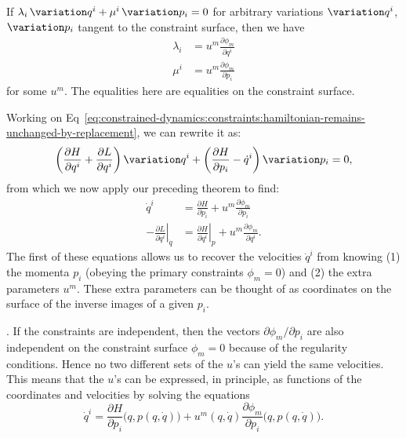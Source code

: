 \begin{theorem}
If $\lambda_{i}\,\variation q^{i} + \mu^{i}\,\variation p_{i}=0$ for
arbitrary variations $\variation q^{i}$, $\variation p_{i}$ tangent to
the constraint surface, then we have
\begin{subequations}
\begin{align}
\lambda_{i} &= u^{m}\frac{\partial\phi_{m}}{\partial q^{i}}\\
\mu^{i} &= u^{m}\frac{\partial\phi_{m}}{\partial p_{i}}
\end{align}
\end{subequations}
for some $u^{m}$. The equalities here are equalities on the constraint surface.
\end{theorem}

\M
Working on Eq~\eqref{eq:constrained-dynamics:constraints:hamiltonian-remains-unchanged-by-replacement},
we can rewrite it as:
\begin{equation}
\left(\frac{\partial H}{\partial q^{i}} + \frac{\partial L}{\partial q^{i}}\right)\variation q^{i}
+\left(\frac{\partial H}{\partial p_{i}} -\dot{q}^{i}\right)\variation p_{i}=0,
\end{equation}
from which we now apply our preceding theorem to
find:
\begin{subequations}
\begin{align}
\dot{q}^{i} &= \frac{\partial H}{\partial p_{i}} + u^{m}\frac{\partial\phi_{m}}{\partial p_{i}}\\
\left.-\frac{\partial L}{\partial q^{i}}\right|_{\dot{q}}
&=\left.\frac{\partial H}{\partial q^{i}}\right|_{p}+u^{m}\frac{\partial\phi_{m}}{\partial q^{i}}.
\end{align}
\end{subequations}
The first of these equations allows us to recover the velocities
$\dot{q}^{i}$ from knowing (1) the momenta $p_{i}$ (obeying the primary
constraints $\phi_{m}=0$) and (2) the extra parameters $u^{m}$. These
extra parameters can be thought of as coordinates on the surface of the
inverse images of a given $p_{i}$.

.
If the constraints are independent, then the vectors
$\partial\phi_{m}/\partial p_{i}$ are also independent on the constraint
surface $\phi_{m}=0$ because of the regularity conditions. Hence no two
different sets of the $u$'s can yield the same velocities. This means
that the $u$'s can be expressed, in principle, as functions of the
coordinates and velocities by solving the equations
\begin{equation}
\dot{q}^{i}
= \frac{\partial H}{\partial p_{i}}\bigl(q,p(q,\dot{q})\bigr)
+ u^{m}(q,\dot{q})\frac{\partial\phi_{m}}{\partial p_{i}}\bigl(q,p(q,\dot{q})\bigr).
\end{equation}

